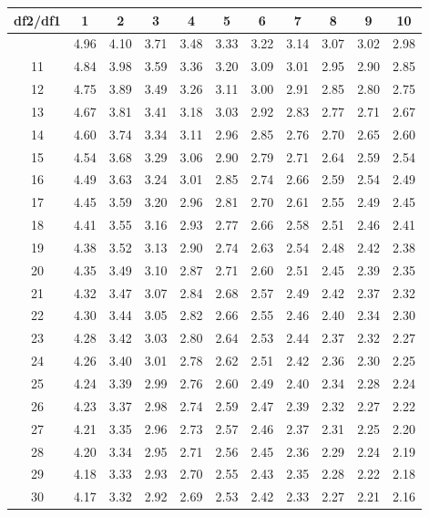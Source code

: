 \documentclass[
]{book}
\theoremstyle{definition}
\theoremstyle{definition}
\theoremstyle{definition}
\theoremstyle{definition}
\theoremstyle{remark}
\begin{document}
\begin{longtable}[]{@{}ccccccccccc@{}}
\toprule\noalign{}
df2/df1 & 1 & 2 & 3 & 4 & 5 & 6 & 7 & 8 & 9 & 10 \\
\midrule\noalign{}
\endhead
\bottomrule\noalign{}
\endlastfoot
10 & 4.96 & 4.10 & 3.71 & 3.48 & 3.33 & 3.22 & 3.14 & 3.07 & 3.02 & 2.98 \\
11 & 4.84 & 3.98 & 3.59 & 3.36 & 3.20 & 3.09 & 3.01 & 2.95 & 2.90 & 2.85 \\
12 & 4.75 & 3.89 & 3.49 & 3.26 & 3.11 & 3.00 & 2.91 & 2.85 & 2.80 & 2.75 \\
13 & 4.67 & 3.81 & 3.41 & 3.18 & 3.03 & 2.92 & 2.83 & 2.77 & 2.71 & 2.67 \\
14 & 4.60 & 3.74 & 3.34 & 3.11 & 2.96 & 2.85 & 2.76 & 2.70 & 2.65 & 2.60 \\
15 & 4.54 & 3.68 & 3.29 & 3.06 & 2.90 & 2.79 & 2.71 & 2.64 & 2.59 & 2.54 \\
16 & 4.49 & 3.63 & 3.24 & 3.01 & 2.85 & 2.74 & 2.66 & 2.59 & 2.54 & 2.49 \\
17 & 4.45 & 3.59 & 3.20 & 2.96 & 2.81 & 2.70 & 2.61 & 2.55 & 2.49 & 2.45 \\
18 & 4.41 & 3.55 & 3.16 & 2.93 & 2.77 & 2.66 & 2.58 & 2.51 & 2.46 & 2.41 \\
19 & 4.38 & 3.52 & 3.13 & 2.90 & 2.74 & 2.63 & 2.54 & 2.48 & 2.42 & 2.38 \\
20 & 4.35 & 3.49 & 3.10 & 2.87 & 2.71 & 2.60 & 2.51 & 2.45 & 2.39 & 2.35 \\
21 & 4.32 & 3.47 & 3.07 & 2.84 & 2.68 & 2.57 & 2.49 & 2.42 & 2.37 & 2.32 \\
22 & 4.30 & 3.44 & 3.05 & 2.82 & 2.66 & 2.55 & 2.46 & 2.40 & 2.34 & 2.30 \\
23 & 4.28 & 3.42 & 3.03 & 2.80 & 2.64 & 2.53 & 2.44 & 2.37 & 2.32 & 2.27 \\
24 & 4.26 & 3.40 & 3.01 & 2.78 & 2.62 & 2.51 & 2.42 & 2.36 & 2.30 & 2.25 \\
25 & 4.24 & 3.39 & 2.99 & 2.76 & 2.60 & 2.49 & 2.40 & 2.34 & 2.28 & 2.24 \\
26 & 4.23 & 3.37 & 2.98 & 2.74 & 2.59 & 2.47 & 2.39 & 2.32 & 2.27 & 2.22 \\
27 & 4.21 & 3.35 & 2.96 & 2.73 & 2.57 & 2.46 & 2.37 & 2.31 & 2.25 & 2.20 \\
28 & 4.20 & 3.34 & 2.95 & 2.71 & 2.56 & 2.45 & 2.36 & 2.29 & 2.24 & 2.19 \\
29 & 4.18 & 3.33 & 2.93 & 2.70 & 2.55 & 2.43 & 2.35 & 2.28 & 2.22 & 2.18 \\
30 & 4.17 & 3.32 & 2.92 & 2.69 & 2.53 & 2.42 & 2.33 & 2.27 & 2.21 & 2.16 \\

\end{longtable}
\end{document}
